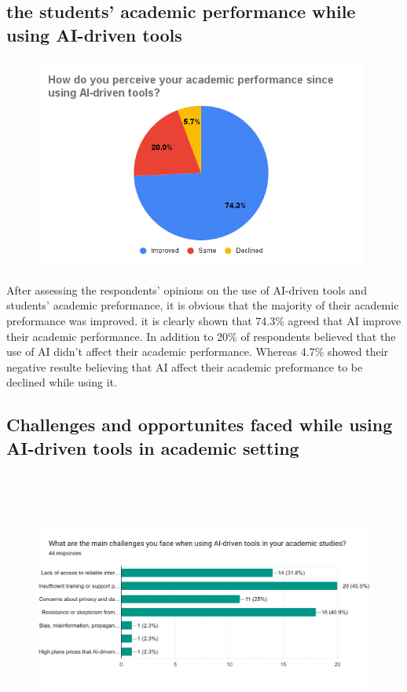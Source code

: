 \subsection{the students' academic performance while using AI-driven tools}
\begin{figure}[h]
	\centering
	\includegraphics[width=11cm, height=7cm]{./chap4/figures/prf}
\end{figure}
After assessing the respondents’ opinions on the use of AI-driven tools
and students' academic preformance, it is obvious that the majority
of their academic preformance was improved. it is clearly shown that
74.3\% agreed that AI improve their academic performance. In addition to
20\% of respondents believed that the use of AI didn't affect their academic
performance. Whereas 4.7\% showed their negative resulte believing that AI
affect their academic preformance to be declined while using it.

\subsection{Challenges and opportunites faced while using AI-driven tools in academic setting}

\begin{figure}[H]
	\centering
	\includegraphics[width=17cm, height=9cm]{./chap4/figures/chall}
\end{figure}


